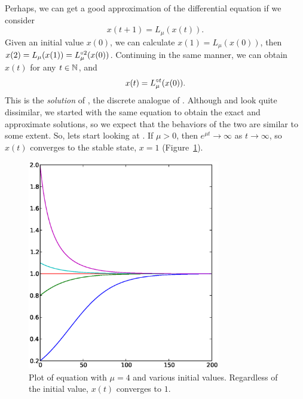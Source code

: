 \documentclass[12pt,twoside]{book}
\begin{document}
Perhaps, we can get a good approximation of the differential equation if we consider
\begin{equation}
  x(t + 1) = L_{\mu}(x(t)).
  \label{eqn:logistic}
\end{equation}
Given an initial value $x(0)$, we can calculate $x(1) = L_\mu(x(0))$, then $x(2) = L_\mu(x(1)) = L_\mu^{\circ 2}(x(0))$.
Continuing in the same manner, we can obtain $x(t)$ for any $t \in \mathbb{N}$, and 
\begin{equation}
  x(t) = L_\mu^{\circ t}(x(0)).
  \label{eqn:logisticsoln}
\end{equation}
This is the \textit{solution} of , the discrete analogue of .
Although  and  look quite dissimilar, we started with the same equation to obtain the exact  and approximate  solutions, so we expect that the behaviors of the two are similar to some extent.
So, lets start looking at .
If $\mu > 0$, then $e^{\mu t} \to \infty$ as $t \to \infty$, so $x(t)$ converges to the stable state, $x = 1$ (Figure~\ref{fig:lde1}).
\begin{figure}[ht]
  \begin{center}
    \includegraphics[width=0.75\textwidth]{logistic_diffeq_mu4_varyingx0}
  \end{center}
  \caption{
    Plot of equation  with $\mu = 4$ and various initial values. 
  Regardless of the initial value, $x(t)$ converges to $1$.
}
  \label{fig:lde1}
\end{figure}
\end{document}
